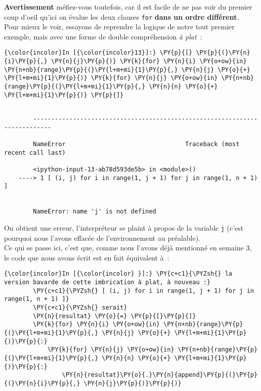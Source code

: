     \textbf{Avertissement} méfiez-vous toutefois, car il est facile de ne
pas voir du premier coup d'oeil qu'ici on évalue les deux clauses
\texttt{for} \textbf{dans un ordre différent}.\\

    Pour mieux le voir, essayons de reprendre la logique de notre tout
premier exemple, mais avec une forme de double compréhension \emph{à
plat}~:

    \begin{Verbatim}[commandchars=\\\{\}]
{\color{incolor}In [{\color{incolor}13}]:} \PY{p}{[} \PY{p}{(}\PY{n}{i}\PY{p}{,} \PY{n}{j}\PY{p}{)} \PY{k}{for} \PY{n}{i} \PY{o+ow}{in} \PY{n+nb}{range}\PY{p}{(}\PY{l+m+mi}{1}\PY{p}{,} \PY{n}{j} \PY{o}{+} \PY{l+m+mi}{1}\PY{p}{)} \PY{k}{for} \PY{n}{j} \PY{o+ow}{in} \PY{n+nb}{range}\PY{p}{(}\PY{l+m+mi}{1}\PY{p}{,} \PY{n}{n} \PY{o}{+} \PY{l+m+mi}{1}\PY{p}{)} \PY{p}{]}
\end{Verbatim}


    \begin{Verbatim}[commandchars=\\\{\}]

        ---------------------------------------------------------------------------

        NameError                                 Traceback (most recent call last)

        <ipython-input-13-ab78d593de5b> in <module>()
    ----> 1 [ (i, j) for i in range(1, j + 1) for j in range(1, n + 1) ]
    

        NameError: name 'j' is not defined

    \end{Verbatim}

    On obtient une erreur, l'interpréteur se plaint à propos de la variable
\texttt{j} (c'est pourquoi nous l'avons effacée de l'environnement au
préalable).\\

    Ce qui se passe ici, c'est que, comme nous l'avons déjà mentionné en
semaine 3, le code que nous avons écrit est en fait équivalent à~:

    \begin{Verbatim}[commandchars=\\\{\}]
{\color{incolor}In [{\color{incolor} }]:} \PY{c+c1}{\PYZsh{} la version bavarde de cette imbrication à plat, à nouveau :}
        \PY{c+c1}{\PYZsh{} [ (i, j) for i in range(1, j + 1) for j in range(1, n + 1) ]}
        \PY{c+c1}{\PYZsh{} serait}
        \PY{n}{resultat} \PY{o}{=} \PY{p}{[}\PY{p}{]}
        \PY{k}{for} \PY{n}{i} \PY{o+ow}{in} \PY{n+nb}{range}\PY{p}{(}\PY{l+m+mi}{1}\PY{p}{,} \PY{n}{j} \PY{o}{+} \PY{l+m+mi}{1}\PY{p}{)}\PY{p}{:}
            \PY{k}{for} \PY{n}{j} \PY{o+ow}{in} \PY{n+nb}{range}\PY{p}{(}\PY{l+m+mi}{1}\PY{p}{,} \PY{n}{n} \PY{o}{+} \PY{l+m+mi}{1}\PY{p}{)}\PY{p}{:}
                \PY{n}{resultat}\PY{o}{.}\PY{n}{append}\PY{p}{(}\PY{p}{(}\PY{n}{i}\PY{p}{,} \PY{n}{j}\PY{p}{)}\PY{p}{)}
\end{Verbatim}


